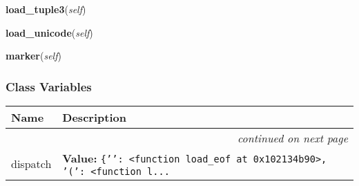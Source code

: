     \vspace{0.5ex}

\hspace{.8\funcindent}\begin{boxedminipage}{\funcwidth}

    \raggedright \textbf{load\_tuple3}(\textit{self})

\setlength{\parskip}{2ex}
\setlength{\parskip}{1ex}
    \end{boxedminipage}

    \label{pickle:Unpickler:load_unicode}

    \vspace{0.5ex}

\hspace{.8\funcindent}\begin{boxedminipage}{\funcwidth}

    \raggedright \textbf{load\_unicode}(\textit{self})

\setlength{\parskip}{2ex}
\setlength{\parskip}{1ex}
    \end{boxedminipage}

    \label{pickle:Unpickler:marker}

    \vspace{0.5ex}

\hspace{.8\funcindent}\begin{boxedminipage}{\funcwidth}

    \raggedright \textbf{marker}(\textit{self})

\setlength{\parskip}{2ex}
\setlength{\parskip}{1ex}
    \end{boxedminipage}



  \subsubsection{Class Variables}

    \vspace{-1cm}
\hspace{\varindent}\begin{longtable}{|p{\varnamewidth}|p{\vardescrwidth}|l}
\cline{1-2}
\cline{1-2} \centering \textbf{Name} & \centering \textbf{Description}& \\
\cline{1-2}
\endhead\cline{1-2}\multicolumn{3}{r}{\small\textit{continued on next page}}\\\endfoot\cline{1-2}
\endlastfoot\raggedright d\-i\-s\-p\-a\-t\-c\-h\- & \raggedright \textbf{Value:} 
{\tt \texttt{\{}\texttt{'}\texttt{}\texttt{'}\texttt{: }{\textless}function load\_eof at 0x102134b90{\textgreater}\texttt{, }\texttt{'}\texttt{(}\texttt{'}\texttt{: }{\textless}function l\texttt{...}}&\\
\cline{1-2}
\end{longtable}

